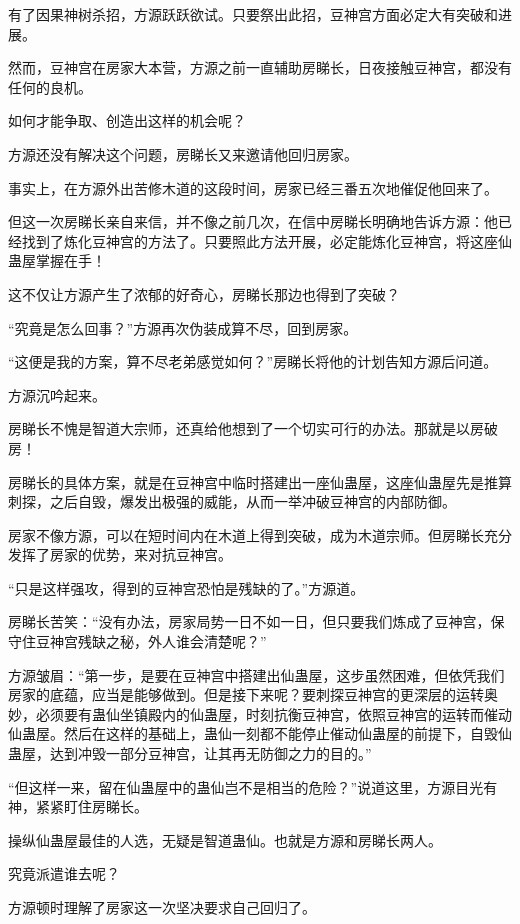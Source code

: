 \begin{this_body}
有了因果神树杀招，方源跃跃欲试。只要祭出此招，豆神宫方面必定大有突破和进展。

然而，豆神宫在房家大本营，方源之前一直辅助房睇长，日夜接触豆神宫，都没有任何的良机。

如何才能争取、创造出这样的机会呢？

方源还没有解决这个问题，房睇长又来邀请他回归房家。

事实上，在方源外出苦修木道的这段时间，房家已经三番五次地催促他回来了。

但这一次房睇长亲自来信，并不像之前几次，在信中房睇长明确地告诉方源：他已经找到了炼化豆神宫的方法了。只要照此方法开展，必定能炼化豆神宫，将这座仙蛊屋掌握在手！

这不仅让方源产生了浓郁的好奇心，房睇长那边也得到了突破？

“究竟是怎么回事？”方源再次伪装成算不尽，回到房家。

“这便是我的方案，算不尽老弟感觉如何？”房睇长将他的计划告知方源后问道。

方源沉吟起来。

房睇长不愧是智道大宗师，还真给他想到了一个切实可行的办法。那就是以房破房！

房睇长的具体方案，就是在豆神宫中临时搭建出一座仙蛊屋，这座仙蛊屋先是推算刺探，之后自毁，爆发出极强的威能，从而一举冲破豆神宫的内部防御。

房家不像方源，可以在短时间内在木道上得到突破，成为木道宗师。但房睇长充分发挥了房家的优势，来对抗豆神宫。

“只是这样强攻，得到的豆神宫恐怕是残缺的了。”方源道。

房睇长苦笑：“没有办法，房家局势一日不如一日，但只要我们炼成了豆神宫，保守住豆神宫残缺之秘，外人谁会清楚呢？”

方源皱眉：“第一步，是要在豆神宫中搭建出仙蛊屋，这步虽然困难，但依凭我们房家的底蕴，应当是能够做到。但是接下来呢？要刺探豆神宫的更深层的运转奥妙，必须要有蛊仙坐镇殿内的仙蛊屋，时刻抗衡豆神宫，依照豆神宫的运转而催动仙蛊屋。然后在这样的基础上，蛊仙一刻都不能停止催动仙蛊屋的前提下，自毁仙蛊屋，达到冲毁一部分豆神宫，让其再无防御之力的目的。”

“但这样一来，留在仙蛊屋中的蛊仙岂不是相当的危险？”说道这里，方源目光有神，紧紧盯住房睇长。

操纵仙蛊屋最佳的人选，无疑是智道蛊仙。也就是方源和房睇长两人。

究竟派遣谁去呢？

方源顿时理解了房家这一次坚决要求自己回归了。


\end{this_body}

